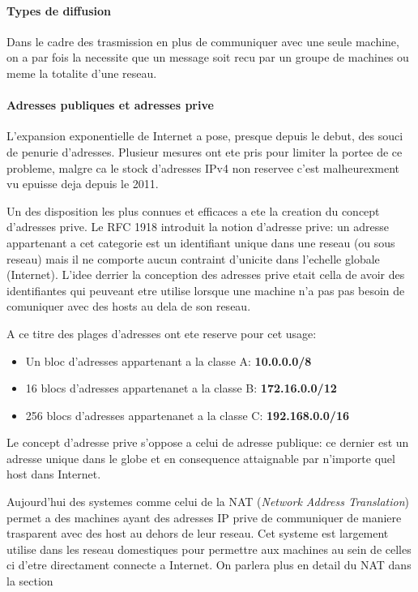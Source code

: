 \paragraph{Types de diffusion}
Dans le cadre des trasmission en plus de communiquer avec une seule machine, on
a par fois la necessite que un message soit recu par un groupe de machines ou
meme la totalite d'une reseau.



\paragraph{Adresses publiques et adresses prive}
L'expansion exponentielle de Internet a pose, presque depuis le debut, des
souci de penurie d'adresses. Plusieur mesures ont ete pris pour limiter la
portee de ce probleme, malgre ca le stock d'adresses IPv4 non reservee
c'est malheurexment vu epuisse deja depuis le 2011.

Un des disposition les plus connues et efficaces a ete la creation du concept
d'adresses prive. Le RFC 1918 introduit la notion d'adresse prive: un adresse
appartenant a cet categorie est un identifiant unique dans une reseau (ou sous
reseau) mais il ne comporte aucun contraint d'unicite dans l'echelle globale
(Internet). L'idee derrier la conception des adresses prive etait cella de
avoir des identifiantes qui peuveant etre utilise lorsque une machine n'a pas
pas besoin de comuniquer avec des hosts au dela de son reseau.

A ce titre des plages d'adresses ont ete reserve pour cet usage:

\begin{itemize}
\item Un bloc d'adresses appartenant a la classe A: \textbf{10.0.0.0/8}
\item 16 blocs d'adresses appartenanet a la classe B: \textbf{172.16.0.0/12}
\item 256 blocs d'adresses appartenanet a la classe C: \textbf{192.168.0.0/16}
\end{itemize}

\smallbreak
Le concept d'adresse prive s'oppose a celui de adresse publique: ce dernier est 
un adresse unique dans le globe et en consequence attaignable par n'importe
quel host dans Internet.

Aujourd'hui des systemes comme celui de la NAT ({\it Network Address
Translation}) permet a des machines ayant des adresses IP prive de communiquer
de maniere trasparent avec des host au dehors de leur reseau. Cet systeme est
largement utilise dans les reseau domestiques pour permettre aux machines au
sein de celles ci d'etre directament connecte a Internet. On parlera plus en
detail du NAT dans la section %
\smallbreak


